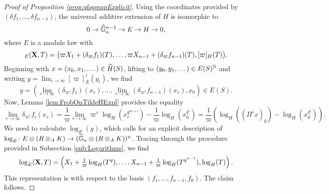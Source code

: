 \documentclass[../main.tex]{subfiles}
\begin{document}
\begin{proof}[Proof of Proposition \ref{prop:qlogmapExplicit}]
  Using the coordinates provided by $(\delta f_1, \dots, \delta f_{n-1})$, the
  universal additive extension of $H$ is isomorphic to 
  \begin{equation*}
    0 \to \Ghat_a^{n-1} \to E \to H \to 0,
  \end{equation*}
  where $E$ is a module law with 
  \begin{equation*}
    [\varpi]_E(\bX, T) = \big(\varpi X_1 + (\delta_{\varpi}f_1)(T), \dots, \varpi X_{n-1} + 
    (\delta_{\varpi}f_{n-1})(T), [\varpi]_H(T)\big).
  \end{equation*}
  Beginning with $x = (x_0, x_1, \dots) \in \Tilde H (S)$, lifting to $(y_0,
  y_1, \dots) \in E(S)^\N$ 
  and writing $y = \lim_{i\to\infty} [\varpi]_E^i (y_i)$, we find
  \begin{equation*}
    y = \left(\lim_{r\to\infty} (\delta_{\varpi^r} f_1)(x_r), \dots, \lim_{r\to \infty}
    (\delta_{\varpi^r}f_{n-1})(x_r), x_0\right) \in E(S).
  \end{equation*}
  Now, Lemma \ref{lem:FrobOnTildeHExpl} provides the equality
  $$\lim_{r\to\infty}\delta_{\varpi^r} f_i(x_r) = \frac 1\varpi \lim_{r \to \infty}
  \varpi^r \log_H(x_r^{q^{nr+i}}) - \frac 1\varpi \log_H\left(x_0^{q^i}\right) = 
  \frac 1\varpi \left(\log_H((\Pi^i x)_0)- \log_H(x_0^{q^i})\right).$$
  We need to calculate $\log_E(y)$, which calls for an explicit description of 
  $\log_E \colon E \otimes (R \otimes_AK) \to (\Ghat_a \otimes(R \otimes_A K))^n$. 
  Tracing through the procedure provided in Subsection \ref{sub:Logarithms},
  we find
  \begin{equation*}
    \log_E(\bX, T) = \left(X_1 + \tfrac 1\varpi \log_H(T^q), \dots, 
    X_{n-1} + \tfrac 1\varpi \log_H(T^{q^{n-1}}), \log_H(T)\right).
  \end{equation*}
  This representation is with respect to the basis $(f_1, \dots, f_{n-1}, f_0)$. 
  The claim follows.
\end{proof}

\end{document}
